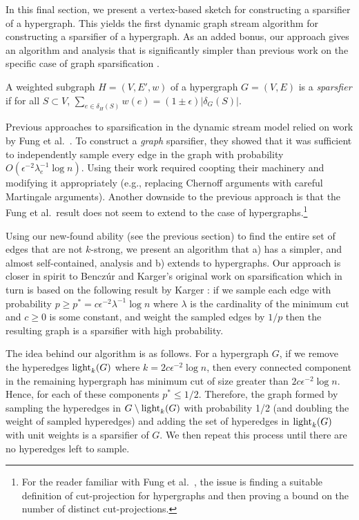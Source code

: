 In this final section, we present a vertex-based sketch for constructing a sparsifier of a hypergraph. This yields the first dynamic graph stream algorithm for constructing a sparsifier of a hypergraph.  As an added bonus, our approach gives an algorithm and analysis that is significantly simpler than previous work on the specific case of graph sparsification \cite{AhnGM12b,GoelKP12}.


\begin{definition}
A weighted subgraph $H=(V,E',w)$ of a hypergraph $G=(V,E)$ is a \emph{sparsfier} if for all $S\subset V$,
$
\sum_{e\in \delta_H(S)} w(e) =(1\pm \epsilon) | \delta_G(S) |$.  
\end{definition}

Previous approaches to sparsification in the dynamic stream model relied on work by Fung et al.~\cite{FungHHP11}. To construct a \emph{graph} sparsifier, they showed that it was sufficient to independently sample every edge in the graph with probability $O(\epsilon^{-2} \lambda_e^{-1} \log n)$. Using their work required coopting their machinery and modifying it appropriately (e.g., replacing Chernoff arguments with careful Martingale arguments). Another downside to the previous approach is that the Fung et al.~result  does not seem to extend to the case of hypergraphs.\footnote{For the reader familiar with  Fung et al.~\cite{FungHHP11}, the issue is finding a suitable definition of cut-projection for hypergraphs and then proving a bound on the number of distinct cut-projections.}

Using our new-found ability (see the previous section) to find  the entire set of edges that are not $k$-strong, we present an algorithm that a) has a simpler, and almost self-contained, analysis and b) extends to hypergraphs. Our approach is closer in spirit to Bencz{\'u}r and Karger's original work on sparsification \cite{BenczurK96} which in turn is based on the following result by Karger \cite{Karger94}: if we sample each edge with probability $p\geq p^* =c \epsilon^{-2} \lambda^{-1} \log n$ where $\lambda$ is the cardinality of the minimum cut and $c\geq 0$ is some constant, and weight the sampled edges by $1/p$ then the resulting graph is a sparsifier with high probability.

The idea behind our algorithm is  as follows. For a hypergraph $G$, if we remove the hyperedges $\operatorname{{light}}_k(G)$ where $k=2 c \epsilon^{-2}\log n$, then every connected component in the remaining hypergraph has minimum cut of size greater than $2 c \epsilon^{-2}\log n$. Hence, for each of these components $p^*\leq 1/2$. Therefore, the graph formed by sampling the hyperedges in $G\setminus \operatorname{{light}}_k(G)$ with probability 1/2 (and doubling the weight of sampled hyperedges) and adding the set of hyperedges in $\operatorname{{light}}_k(G)$ with unit weights is a sparsifier of $G$. We then repeat this process until there are no hyperedges left to sample. 

